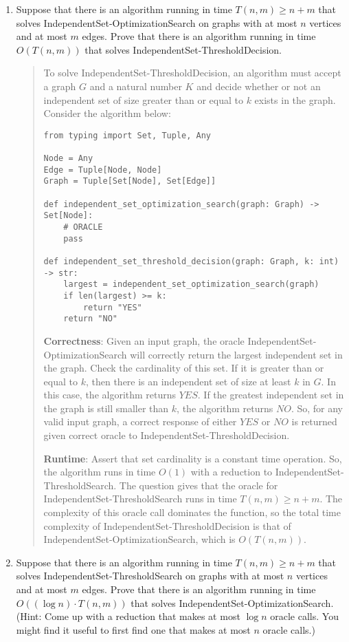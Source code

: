 \documentclass[11pt]{article}
\begin{document}
\begin{enumerate}
 \begin{enumerate}
 \item Suppose that there is an algorithm running in time $T(n,m)\geq n+m$ that solves IndependentSet-OptimizationSearch on graphs with at most $n$ vertices and at most $m$ edges.  Prove that there is an algorithm running in time $O(T(n,m))$ that solves IndependentSet-ThresholdDecision. 
 \begin{quote}
     \color{purple}
     To solve IndependentSet-ThresholdDecision, an algorithm must accept a graph $G$ and a natural number $K$ and decide whether or not an independent set of size greater than or equal to $k$ exists in the graph. Consider the algorithm below: \newline 
     \begin{verbatim}
from typing import Set, Tuple, Any

Node = Any
Edge = Tuple[Node, Node]
Graph = Tuple[Set[Node], Set[Edge]]

def independent_set_optimization_search(graph: Graph) -> Set[Node]:
    # ORACLE
    pass

def independent_set_threshold_decision(graph: Graph, k: int) -> str:
    largest = independent_set_optimization_search(graph)
    if len(largest) >= k:
        return "YES"
    return "NO"
     \end{verbatim}
    \vspace{1em}
    \textbf{Correctness}: \newline 
    Given an input graph, the oracle IndependentSet-OptimizationSearch will correctly return the largest independent set in the graph. Check the cardinality of this set. If it is greater than or equal to $k$, then there is an independent set of size at least $k$ in $G$. In this case, the algorithm returns $YES$. If the greatest independent set in the graph is still smaller than $k$, the algorithm returns $NO$. So, for any valid input graph, a correct response of either $YES$ or $NO$ is returned given correct oracle to IndependentSet-ThresholdDecision. \newline 

    \textbf{Runtime}: \newline 
    Assert that set cardinality is a constant time operation. So, the algorithm runs in time $O(1)$ with a reduction to IndependentSet-ThresholdSearch. The question gives that the oracle for IndependentSet-ThresholdSearch runs in time $T(n, m) \geq n + m$. The complexity of this oracle call dominates the function, so the total time complexity of IndependentSet-ThresholdDecision is that of IndependentSet-OptimizationSearch, which is $O(T(n, m))$.
 \end{quote}
 \item Suppose that there is an algorithm running in time $T(n,m)\geq n+m$ that solves IndependentSet-ThresholdSearch on graphs with at most $n$ vertices and at most $m$ edges.  Prove that there is an algorithm running in time $O((\log n)\cdot T(n,m))$ that solves IndependentSet-OptimizationSearch.  (Hint: Come up with a reduction that makes at most $\log n$ oracle calls.  You might find it useful to first find one that makes at most $n$ oracle calls.)
 

\end{enumerate}
\end{enumerate}
\end{document}
